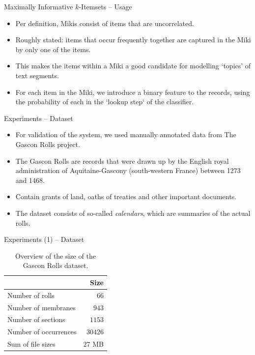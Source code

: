 \documentclass[12pt]{beamer}
\theoremstyle{break}
\begin{document}
\begin{frame}{Maximally Informative $k$-Itemsets -- Usage}

	\begin{itemize}
		\item Per definition, Mikis consist of items that are \alert{uncorrelated}.
		\item Roughly stated: items that occur frequently together are captured in the Miki by only one of the items.
		\item This makes the items within a Miki a good candidate for modelling `topics' of text segments.
		\item For each item in the Miki, we introduce a binary feature to the records, using the probability of each in the `lookup step` of the classifier.
	\end{itemize}
	
\end{frame}




\begin{frame}{Experiments -- Dataset}
	
	\begin{itemize}
		\item For validation of the system, we used manually annotated data from The Gascon Rolls project.
		\item The Gascon Rolls are records that were drawn up by the English royal administration of Aquitaine-Gascony (south-western France) between 1273 and 1468.
		\item Contain grants of land, oaths of treaties and other important documents.
		\item The dataset consists of so-called \emph{calendars}, which are summaries of the actual rolls.
	\end{itemize}
	
\end{frame}




\begin{frame}{Experiments (1) -- Dataset}

\begin{table}
    \centering
    \caption{Overview of the size of the Gascon Rolls dataset.}
    \label{tab:data_overview}
    \begin{tabular}{l r}
        \toprule
        & Size \\
        \midrule
        Number of rolls & $66$ \\
        Number of membranes & $943$ \\
        Number of sections & $1153$ \\
        Number of occurrences & $30426$ \\
        Sum of file sizes & $27$ MB \\
        \bottomrule
    \end{tabular}
\end{table}
	
\end{frame}
\end{document}
